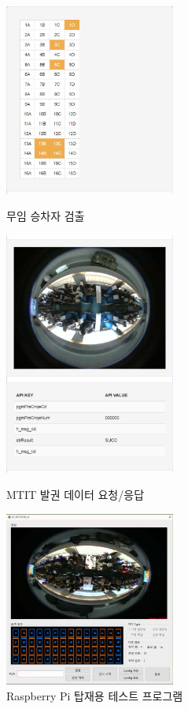 \begin{figure}[!ht]
	\begin{fullwidth}
		\parbox{0.5\textwidth}{
			\centering
			\includegraphics[width=0.5\textwidth]{images/korail_seat_01_01.png}
			\caption*{무임 승차자 검출}
		}\qquad
		\parbox{0.5\textwidth}{
			\centering
			\includegraphics[width=0.5\textwidth]{images/korail_seat_01_02.png}
			\caption*{MTIT 발권 데이터 요청/응답}
		}\qquad
		\parbox{0.5\textwidth}{
			\centering
			\includegraphics[width=0.5\textwidth]{images/korail_seat_02.jpg}
			\caption*{Raspberry Pi 탑재용 테스트 프로그램}
		}
	\end{fullwidth}
\end{figure}

